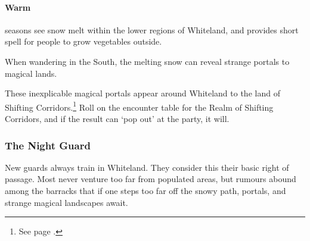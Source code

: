 \begin{multicols}{2}
\paragraph{Warm} seasons see snow melt within the lower regions of Whiteland, and provides short spell for people to grow vegetables outside.

When wandering in the South, the melting snow can reveal strange portals to magical lands.

These inexplicable magical portals appear around Whiteland to the land of Shifting Corridors.\footnote{See page \pageref{shiftingcorridors}.}
Roll on the encounter table for the Realm of Shifting Corridors, and if the result can `pop out' at the party, it will.

\subsubsection{The Night Guard}

New guards always train in Whiteland.
They consider this their basic right of passage.
Most never venture too far from populated areas, but rumours abound among the barracks that if one steps too far off the snowy path, portals, and strange magical landscapes await.

\end{multicols}

\vfill\null
